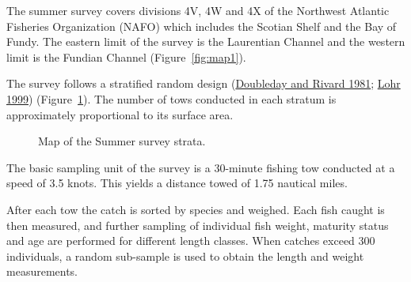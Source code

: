 \documentclass[12pt]{article}\usepackage[]{graphicx}\usepackage[]{color}
\begin{document}
The summer survey covers divisions 4V, 4W and 4X of the Northwest Atlantic Fisheries Organization (NAFO) which includes the Scotian Shelf and the Bay of Fundy. The eastern limit of the survey is the Laurentian Channel and the western limit is the Fundian Channel (Figure~\ref{fig:map1}).

The survey follows a stratified random design (\protect\hyperlink{ref-DoubledayRivard1981}{Doubleday and Rivard 1981}; \protect\hyperlink{ref-Lohr1999}{Lohr 1999}) (Figure~\ref{fig:map2}). The number of tows conducted in each stratum is approximately proportional to its surface area.


\begin{figure}[htb]

{\centering {} 

}

\caption{Map of the Summer survey strata.}\label{fig:map2}
\end{figure}
The basic sampling unit of the survey is a 30-minute fishing tow conducted at a speed of 3.5 knots. This yields a distance towed of 1.75 nautical miles.

After each tow the catch is sorted by species and weighed. Each fish caught is then measured, and further sampling of individual fish weight, maturity status and age are performed for diﬀerent length classes. When catches exceed 300 individuals, a random sub-sample is used to obtain the length and weight measurements.
\end{document}
